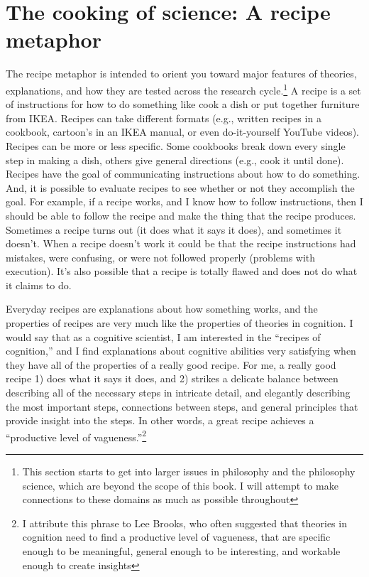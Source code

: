 \documentclass[
  oneside,
  12pt]{crumpbook}
\begin{document}
\hypertarget{the-cooking-of-science-a-recipe-metaphor}{%
\section{The cooking of science: A recipe metaphor}\label{the-cooking-of-science-a-recipe-metaphor}}

The recipe metaphor is intended to orient you toward major features of theories, explanations, and how they are tested across the research cycle.\footnote{This section starts to get into larger issues in philosophy and the philosophy science, which are beyond the scope of this book. I will attempt to make connections to these domains as much as possible throughout} A recipe is a set of instructions for how to do something like cook a dish or put together furniture from IKEA. Recipes can take different formats (e.g., written recipes in a cookbook, cartoon's in an IKEA manual, or even do-it-yourself YouTube videos). Recipes can be more or less specific. Some cookbooks break down every single step in making a dish, others give general directions (e.g., cook it until done). Recipes have the goal of communicating instructions about how to do something. And, it is possible to evaluate recipes to see whether or not they accomplish the goal. For example, if a recipe works, and I know how to follow instructions, then I should be able to follow the recipe and make the thing that the recipe produces. Sometimes a recipe turns out (it does what it says it does), and sometimes it doesn't. When a recipe doesn't work it could be that the recipe instructions had mistakes, were confusing, or were not followed properly (problems with execution). It's also possible that a recipe is totally flawed and does not do what it claims to do.

Everyday recipes are explanations about how something works, and the properties of recipes are very much like the properties of theories in cognition. I would say that as a cognitive scientist, I am interested in the ``recipes of cognition,'' and I find explanations about cognitive abilities very satisfying when they have all of the properties of a really good recipe. For me, a really good recipe 1) does what it says it does, and 2) strikes a delicate balance between describing all of the necessary steps in intricate detail, and elegantly describing the most important steps, connections between steps, and general principles that provide insight into the steps. In other words, a great recipe achieves a ``productive level of vagueness.''\footnote{I attribute this phrase to Lee Brooks, who often suggested that theories in cognition need to find a productive level of vagueness, that are specific enough to be meaningful, general enough to be interesting, and workable enough to create insights}
\end{document}

